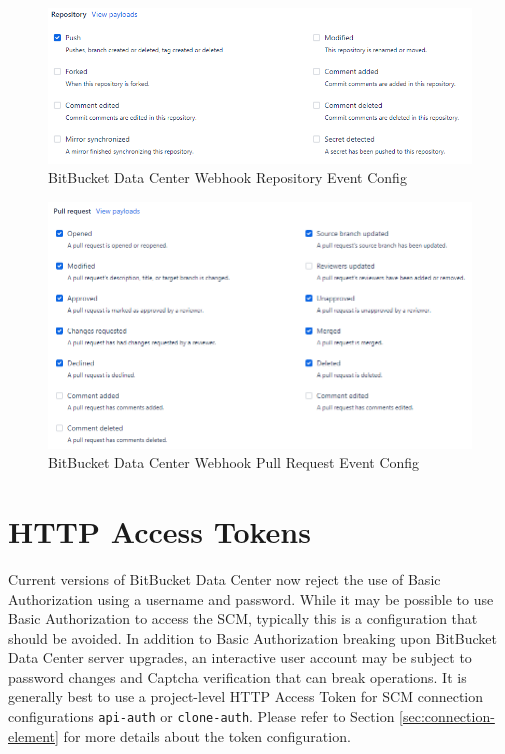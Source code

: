 \begin{figure}[ht]
    \includegraphics[width=\textwidth]{graphics/bbdc-repository-event-config.png}
    \caption{BitBucket Data Center Webhook Repository Event Config}
    \label{fig:bbdc-repo-event-config}
\end{figure}

\begin{figure}[ht]
    \includegraphics[width=\textwidth]{graphics/bbdc-pr-event-config.png}
    \caption{BitBucket Data Center Webhook Pull Request Event Config}
    \label{fig:bbdc-pr-event-config}
\end{figure}


\section{\cxoneflow HTTP Access Tokens}

Current versions of BitBucket Data Center now reject the use of Basic Authorization using
a username and password. While it may be possible to use Basic Authorization to access the SCM, typically
this is a configuration that should be avoided.  In addition to Basic Authorization breaking upon BitBucket Data Center
server upgrades, an interactive user account may be subject to password changes and Captcha verification that
can break \cxoneflow operations.  It is generally best to use a project-level HTTP Access Token for SCM connection
configurations \texttt{api-auth} or \texttt{clone-auth}.  Please refer to Section \ref{sec:connection-element} for more
details about the token configuration.

